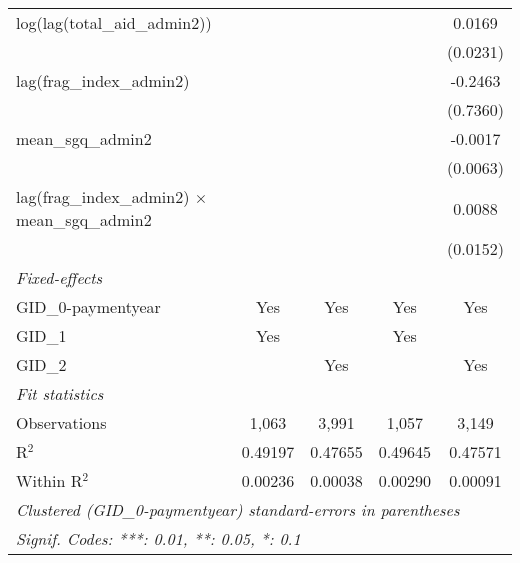 \begin{tabular}{lcccc}
   log(lag(total\_aid\_admin2))                             &          &          &          & 0.0169\\   
                                                            &          &          &          & (0.0231)\\   
   lag(frag\_index\_admin2)                                 &          &          &          & -0.2463\\   
                                                            &          &          &          & (0.7360)\\   
   mean\_sgq\_admin2                                        &          &          &          & -0.0017\\   
                                                            &          &          &          & (0.0063)\\   
   lag(frag\_index\_admin2) $\times$ mean\_sgq\_admin2      &          &          &          & 0.0088\\   
                                                            &          &          &          & (0.0152)\\   
   \midrule
   \emph{Fixed-effects}\\
   GID\_0-paymentyear                                       & Yes      & Yes      & Yes      & Yes\\  
   GID\_1                                                   & Yes      &          & Yes      & \\  
   GID\_2                                                   &          & Yes      &          & Yes\\  
   \midrule
   \emph{Fit statistics}\\
   Observations                                             & 1,063    & 3,991    & 1,057    & 3,149\\  
   R$^2$                                                    & 0.49197  & 0.47655  & 0.49645  & 0.47571\\  
   Within R$^2$                                             & 0.00236  & 0.00038  & 0.00290  & 0.00091\\  
   \midrule \midrule
   \multicolumn{5}{l}{\emph{Clustered (GID\_0-paymentyear) standard-errors in parentheses}}\\
   \multicolumn{5}{l}{\emph{Signif. Codes: ***: 0.01, **: 0.05, *: 0.1}}\\
\end{tabular}
\par\endgroup



